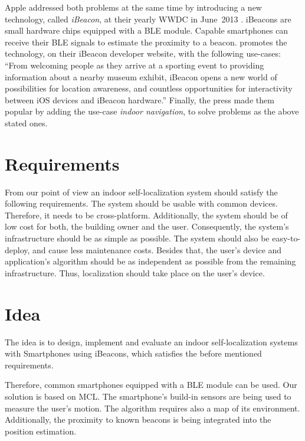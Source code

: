 Apple addressed both problems at the same time by introducing a new technology, called \emph{iBeacon}, at their yearly \ac{WWDC} in June~2013 \citep{apple:wwdc_2013_bruins}. iBeacons are small hardware chips equipped with a \ac{BLE} module. Capable smartphones can receive their \acs{BLE} signals to estimate the proximity to a beacon. \citet{apple:ibeacon_site} promotes the technology, on their iBeacon developer website, with the following use-cases: ``From welcoming people as they arrive at a sporting event to providing information about a nearby museum exhibit, iBeacon opens a new world of possibilities for location awareness, and countless opportunities for interactivity between iOS devices and iBeacon hardware.'' Finally, the press made them popular by adding the use-case \emph{indoor navigation}, to solve problems as the above stated ones.

\section{Requirements}
From our point of view an indoor self-localization system should satisfy the following requirements. The system should be usable with common devices. Therefore, it needs to be cross-platform. Additionally, the system should be of low cost for both, the building owner and the user. Consequently, the system's infrastructure should be as simple as possible. The system should also be easy-to-deploy, and cause less maintenance costs. Besides that, the user's device and application's algorithm should be as independent as possible from the remaining infrastructure. Thus, localization should take place on the user's device.

\section{Idea}
The idea is to design, implement and evaluate an indoor self-localization systems with Smartphones using iBeacons, which satisfies the before mentioned requirements.

Therefore, common smartphones equipped with a \acs{BLE} module can be used. Our solution is based on \ac{MCL}. The smartphone's build-in sensors are being used to measure the user's motion. The algorithm requires also a map of its environment. Additionally, the proximity to known beacons is being integrated into the position estimation.

